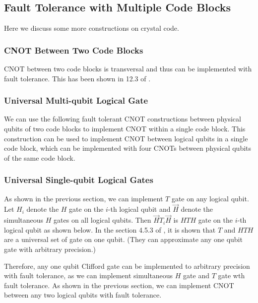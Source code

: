 \subsection{Fault Tolerance with Multiple Code Blocks}

Here we discuss some more constructions on crystal code.

\subsubsection{CNOT Between Two Code Blocks}

CNOT between two code blocks is transversal and thus can be implemented with fault tolerance. 
This has been shown in 12.3 of \cite{kissinger}.

\subsubsection{Universal Multi-qubit Logical Gate}

We can use the following fault tolerant CNOT constructions between physical qubits of two code blocks to implement CNOT within a single code block.
This construction can be used to implement CNOT between logical qubits in a single code block, which can be implemented with four CNOTs between physical qubits of the same code block.

\subsubsection{Universal Single-qubit Logical Gates}

As shown in the previous section, we can implement $T$ gate on any logical qubit. 
Let $H_i$ denote the $H$ gate on the $i$-th logical qubit and $\vec{H}$ denote the simultaneous $H$ gates on all logical qubits. 
Then $\vec{H} T_i \vec{H}$ is $HTH$ gate on the $i$-th logical qubit as shown below.
In the section 4.5.3 of \cite{Nielsen_Chuang_2010}, it is shown that $T$ and $HTH$ are a universal set of gate on one qubit. (They can approximate any one qubit gate with arbitrary precision.) 

Therefore, any one qubit Clifford gate can be implemented to arbitrary precision with fault tolerance, as we can implement simultaneous $H$ gate and $T$ gate wth fault tolerance.
As shown in the previous section, we can implement CNOT between any two logical qubits with fault tolerance.



